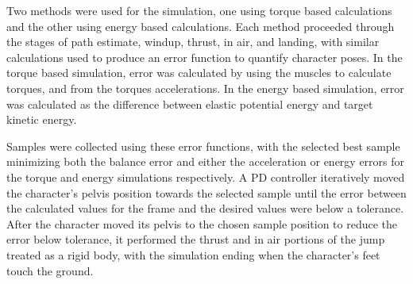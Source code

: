 Two methods were used for the simulation, one using torque based calculations and the other using energy based calculations.  Each method proceeded through the stages of path estimate, windup, thrust, in air, and landing, with similar calculations used to produce an error function to quantify character poses.  In the torque based simulation, error was calculated by using the muscles to calculate torques, and from the torques accelerations.  In the energy based simulation, error was calculated as the difference between elastic potential energy and target kinetic energy.  

Samples were collected using these error functions, with the selected best sample minimizing both the balance error and either the acceleration or energy errors for the torque and energy simulations respectively.  A PD controller iteratively moved the character's pelvis position towards the selected sample until the error between the calculated values for the frame and the desired values were below a tolerance.  After the character moved its pelvis to the chosen sample position to reduce the error below tolerance, it performed the thrust and in air portions of the jump treated as a rigid body, with the simulation ending when the character's feet touch the ground.